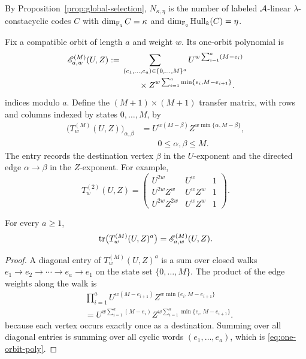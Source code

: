 By Proposition~\ref{prop:global-selection}, $N_{\kappa,\eta}$ is the number of
labeled $\mathcal A$-linear $\lambda$-constacyclic codes $C$ with
$\dim_{\mathbb F_q}C=\kappa$ and $\dim_{\mathbb F_q}\operatorname{Hull}_k(C)=\eta$.

Fix a compatible orbit of length $a$ and weight $w$.  Its one-orbit polynomial
is
\begin{equation}\label{eq:one-orbit-poly}
\begin{split}
\mathscr E_{a,w}^{(M)}(U,Z)
:={}&\sum_{(e_1,\ldots,e_a)\in\{0,\ldots,M\}^a}
U^{w\sum_{i=1}^{a}(M-e_i)}\\
&\qquad {}\times
Z^{w\sum_{i=1}^{a}\min\{e_i,M-e_{i+1}\}}.
\end{split}
\end{equation}
indices modulo $a$.  Define the $(M+1)\times(M+1)$ transfer matrix, with rows
and columns indexed by states $0,\ldots,M$, by
\begin{equation}\label{eq:transfer}
\begin{aligned}
\bigl(T^{(M)}_w(U,Z)\bigr)_{\alpha,\beta}
&= U^{w(M-\beta)}
   Z^{w\min\{\alpha,M-\beta\}},\\
&\qquad 0\leq \alpha,\beta\leq M.
\end{aligned}
\end{equation}
The entry records the destination vertex $\beta$ in the $U$-exponent and the
directed edge $\alpha\to\beta$ in the $Z$-exponent.  For example,
\[
T^{(2)}_w(U,Z)=
\begin{pmatrix}
U^{2w} & U^w & 1\\
U^{2w}Z^w & U^wZ^w & 1\\
U^{2w}Z^{2w} & U^wZ^w & 1
\end{pmatrix}.
\]

\begin{lemma}\label{lem:trace}
For every $a\geq1$,
\[
\operatorname{tr}\bigl(T^{(M)}_w(U,Z)^a\bigr)
   =\mathscr E_{a,w}^{(M)}(U,Z).
\]
\end{lemma}

\begin{proof}
A diagonal entry of $T^{(M)}_w(U,Z)^a$ is a sum over closed walks
$e_1\to e_2\to\cdots\to e_a\to e_1$ on the state set $\{0,\ldots,M\}$.
The product of the edge weights along the walk is
\[
\begin{aligned}
&\prod_{i=1}^{a}
U^{w(M-e_{i+1})}
Z^{w\min\{e_i,M-e_{i+1}\}}\\
&=U^{w\sum_{i=1}^{a}(M-e_i)}
Z^{w\sum_{i=1}^{a}\min\{e_i,M-e_{i+1}\}}.
\end{aligned}
\]
because each vertex occurs exactly once as a destination.  Summing over all
diagonal entries is summing over all cyclic words $(e_1,\ldots,e_a)$, which is
\eqref{eq:one-orbit-poly}.
\end{proof}

